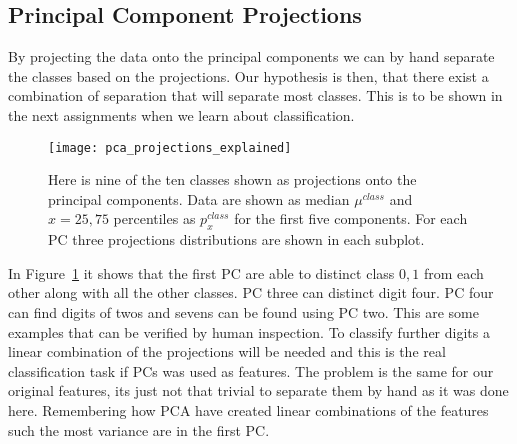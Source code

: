 \subsection{Principal Component Projections}
By projecting the data onto the principal components we can by hand separate the classes based on the projections. Our hypothesis is then, that there exist a combination of separation that will separate most classes. This is to be shown in the next assignments when we learn about classification.
\begin{figure}[hbtp]
\centering
\texttt{[image: pca\_projections\_explained]}
\caption{Here is nine of the ten classes shown as projections onto the principal components. Data are shown as median $\mu^{class}$ and $x={25,75}$ percentiles as $p_{x}^{class}$ for the first five components. For each PC three projections distributions are shown in each subplot. \label{fig:pca_projections_explained}}
\end{figure}
In Figure~\ref{fig:pca_projections_explained} it shows that the first PC are able to distinct class ${0,1}$ from each other along with all the other classes. PC three can distinct digit four. PC four can find digits of twos and sevens can be found using PC two. This are some examples that can be verified by human inspection. To classify further digits a linear combination of the projections will be needed and this is the real classification task if PCs was used as features. The problem is the same for our original features, its just not that trivial to separate them by hand as it was done here. Remembering how PCA have created linear combinations of the features such the most variance are in the first PC. 
